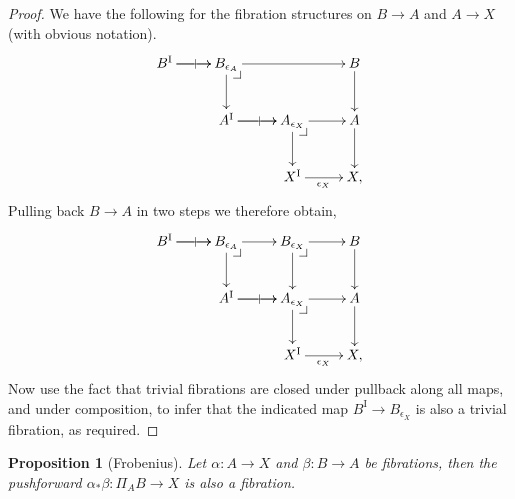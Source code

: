 \documentclass[11pt]{article}
\makeatletter
\newcommand{\pbcorner}[1][dr]{\save*!/#1-1.2pc/#1:(-1,1)@^{|-}\restore}
\newcommand{\ra}{\ensuremath{\rightarrow}}
\newcommand{\I}{\ensuremath{\mathrm{I}}}
\newtheorem{proposition}[theorem]{Proposition}
\theoremstyle{remark}
\theoremstyle{definition}
\makeatother
\begin{document}
\begin{proof}
We have the following for the fibration structures on $B\ra A$ and $A\ra X$ (with obvious notation).
\begin{equation}\label{diagram:fibcomposition1}
\xymatrix{
B^\I \ar[r]|| \ar[r]  & B_{\epsilon_A} \ar[rr]  \ar[d] \pbcorner & & B \ar[d]\\
&A^\I \ar[r]|| \ar[r] & A_{\epsilon_X} \ar[d] \pbcorner \ar[r] & A \ar[d]\\
&& X^\I \ar[r]_{\epsilon_X} &  X,
}
\end{equation}
Pulling back $B\ra A$ in two steps we therefore obtain,
\begin{equation}\label{diagram:fibcomposition2}
\xymatrix{
B^\I \ar[r]|| \ar[r]   & B_{\epsilon_A} \ar[r]  \ar[d] \pbcorner & B_{\epsilon_X}  \ar[d] \pbcorner \ar[r] & B \ar[d]\\
&A^\I \ar[r]|| \ar[r]  & A_{\epsilon_X} \ar[d] \pbcorner \ar[r] & A \ar[d]\\
&& X^\I \ar[r]_{\epsilon_X} &  X,
}
\end{equation}
Now use the fact that trivial fibrations are closed under pullback along all maps, and under composition, to infer that the indicated map $B^\I \to B_{\epsilon_X} $ is also a trivial fibration, as required.
\end{proof}

\begin{proposition}[Frobenius]
Let $\alpha : A \ra X$ and $\beta: B\ra A$  be fibrations, then the pushforward $\alpha_*\beta : \Pi_AB \ra X$ is also a fibration.
\end{proposition}
\end{document}

